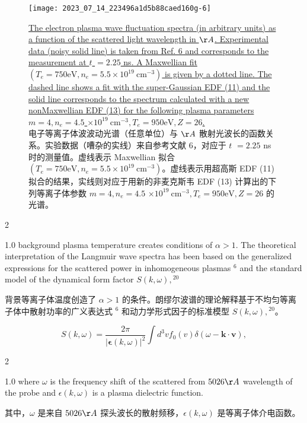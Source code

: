 \documentclass[oneside,onecolumn]{article}
\newcommand\enzhbox[2]{
  	\quad\par \begin{paracol}{2} \colseprulecolor{black} 
  			\begin{spacing}{1.0}
  				\footnotesize  #1
  			\end{spacing}
  		\switchcolumn[1] 
  		#2
  	\end{paracol} 
  }
\begin{document}
\begin{sloppypar}
  \begin{figure}[tbp]
  	\centering
  	\texttt{[image: 2023\_07\_14\_223496a1d5b88caed160g-6]}
  	\caption{\uline{The electron plasma wave fluctuation spectra (in arbitrary units) as a function of the scattered light wavelength in $\AA$. Experimental data (noisy solid line) is taken from Ref. 6 and corresponds to the measurement at $t$ $=2.25$ ns. A Maxwellian fit $\left(T_{e}=750 \mathrm{eV}, n_{e}=5.5 \times 10^{19} \mathrm{~cm}^{-3}\right)$ is given by a dotted line. The dashed line shows a fit with the super-Gaussian EDF (11) and the solid line corresponds to the spectrum calculated with a new nonMaxwellian EDF (13) for the following plasma parameters $m=4, n_{e}=4.5$ $\times 10^{19} \mathrm{~cm}^{-3}, T_{e}=950 \mathrm{eV}, Z=26$.}\\电子等离子体波波动光谱（任意单位）与 $\AA$ 散射光波长的函数关系。实验数据（嘈杂的实线）来自参考文献 6，对应于 $t$ $=2.25$ ns 时的测量值。虚线表示 Maxwellian 拟合 $\left(T_{e}=750 \mathrm{eV}, n_{e}=5.5 \times 10^{19} \mathrm{~cm}^{-3}\right)$。虚线表示用超高斯 EDF (11) 拟合的结果，实线则对应于用新的非麦克斯韦 EDF (13) 计算出的下列等离子体参数 $m=4, n_{e}=4.5$ $\times 10^{19} \mathrm{~cm}^{-3}, T_{e}=950 \mathrm{eV}, Z=26$ 的光谱。}
  	\label{fig6.}
  \end{figure}
  
 
\enzhbox{   background plasma temperature creates conditions of $\alpha>1$. The theoretical interpretation of the Langmuir wave spectra has been based on the generalized expressions for the scattered power in inhomogeneous plasmas $^{6}$ and the standard model of the dynamical form factor $S(k, \omega),{ }^{20}$
}{
背景等离子体温度创造了 $\alpha>1$ 的条件。朗缪尔波谱的理论解释基于不均匀等离子体中散射功率的广义表达式 $^{6}$ 和动力学形式因子的标准模型 $S(k, \omega),{ }^{20}$。

}
  
  \begin{dmath}[compact]
  S(k, \omega)=\frac{2 \pi}{|\boldsymbol{\epsilon}(k, \omega)|^{2}} \int d^{3} v f_{0}(v) \delta(\omega-\mathbf{k} \cdot \mathbf{v}),
  \end{dmath}
  
 
\enzhbox{   where $\omega$ is the frequency shift of the scattered from $5026 \AA$ wavelength of the probe and $\epsilon(k, \omega)$ is a plasma dielectric function.
}{
其中，$\omega$ 是来自 $5026 \AA$ 探头波长的散射频移，$\epsilon(k, \omega)$ 是等离子体介电函数。

}
  

\end{sloppypar}
\end{document}
